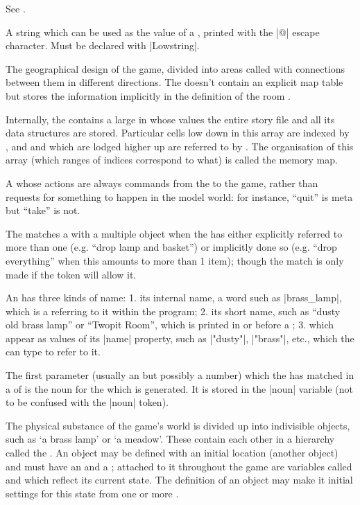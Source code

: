 {{{%
See .

%
A string which can be used as the value of a , printed
with the |@| escape character.  Must be declared with |Lowstring|.

%
The geographical design of the game, divided into areas called 
with connections between them in different directions.  The 
doesn't contain an explicit map table but stores the information implicitly
in the definition of the room .

%
Internally, the  contains a large  in whose values
the entire story file and all its data structures are stored.  Particular
cells low down in this array are indexed by , and
 and  which are lodged higher up are referred to by
.  The organisation of this array (which ranges of
indices correspond to what) is called the memory map.

%
A  whose actions are always commands from the  to the game,
rather than requests for something to happen in the model world: for
instance, ``quit'' is meta but ``take'' is not.

%
The  matches a  with a multiple object when the 
has either explicitly referred to more than one  (e.g. ``drop
lamp and basket'') or implicitly done so (e.g. ``drop everything'' when
this amounts to more than 1 item); though the match is only made if the
token will allow it.

%
An  has three kinds of name: 1. its internal name, a word such
as |brass_lamp|, which is a  referring to it within the program;
2. its short name, such as ``dusty old brass lamp'' or ``Twopit Room'',
which is printed in  or before a ; 3.
 which appear as values of its |name| property, such
as |"dusty"|, |"brass"|, etc., which the  can type to refer to it.

%
The first parameter (usually an  but possibly a number) which
the  has matched in a  of  is the noun for
the  which is generated.  It is stored in the |noun| variable
(not to be confused with the |noun| token).

%
The physical substance of the game's world is divided up into indivisible
objects, such as `a brass lamp' or `a meadow'.  These contain each other
in a hierarchy called the .  An object may be defined with an
initial location (another object) and must have an  and
a ; attached to it throughout the game are variables called
 and  which reflect its current state.  The
definition of an object may make it  initial settings for this
state from one or more .

}}}
